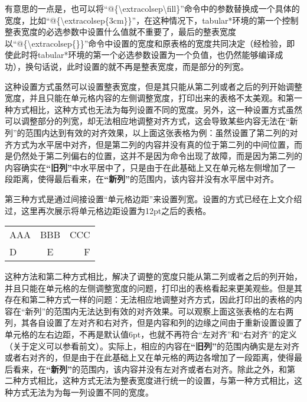 ﻿\documentclass{article}
\begin{document}
    有意思的一点是，也可以将``@\{\textbackslash extracolsep{\textbackslash fill}\}''命令中的参数替换成一个具体的宽度，比如``@\{\textbackslash extracolsep\{3cm\}\}''，在这种情况下，tabular*环境的第一个控制整表宽度的必选参数中设置什么值就不重要了，最后的整表宽度以``@\{\textbackslash extracolsep\{\}\}''命令中设置的宽度和原表格的宽度共同决定（经检验，即使此时将tabular*环境的第一个必选参数设置为一个负值，也仍然能够编译成功），换句话说，此时设置的就不再是整表宽度，而是部分的列宽。
    
    这种设置方式虽然可以设置整表宽度，但是其只能从第二列或者之后的列开始调整宽度，并且只能在单元格内容的左侧调整宽度，打印出来的表格不太美观。和第一种方式相比，这种方式也无法为每列设置不同的宽度。另外，这一种设置方式虽然可以调整部分的列宽，却无法相应地调整对齐方式，这会导致某些内容无法在``新列''的范围内达到有效的对齐效果，以上面这张表格为例：虽然设置了第二列的对齐方式为水平居中对齐，但是第二列的内容并没有真的位于第二列的中间位置，而是仍然处于第二列偏右的位置，这并不是因为命令出现了故障，而是因为第二列的内容确实在\textbf{``旧列''}中水平居中了，只是由于在此基础上又在单元格左侧增加了一段距离，使得最后看来，在\textbf{``新列''}的范围内，该内容并没有水平居中对齐。

    第三种方式是通过间接设置``单元格边距''来设置列宽。设置的方式已经在上文介绍过，这里再次展示将单元格边距设置为12pt之后的表格。

    \mbox{}

    {\renewcommand{\tabcolsep}{12pt}

    \begin{tabular}{l|c|r}
        \hline
        AAA&BBB&CCC\\
        D&E&F\\
        \hline
    \end{tabular}
    }

    \mbox{}
    
    这种方法和第二种方式相比，解决了调整的宽度只能从第二列或者之后的列开始，并且只能在单元格的左侧调整宽度的问题，打印出的表格看起来更美观些。但是其存在和第二种方式一样的问题：无法相应地调整对齐方式，因此打印出的表格的内容在``新列''的范围内无法达到有效的对齐效果。可以观察上面这张表格的左右两列，其各自设置了左对齐和右对齐，但是内容和列的边缘之间由于重新设置设置了单元格的左右边距，不再是默认值6pt，也就不再符合``左对齐''和``右对齐''的定义（关于定义可以参看前文）。实际上，相应的内容在\textbf{``旧列''}的范围内确实是左对齐或者右对齐的，但是由于在此基础上又在单元格的两边各增加了一段距离，使得最后看来，在\textbf{``新列''}的范围内，该内容并没有左对齐或者右对齐。除此之外，和第二种方式相比，这种方式无法为整表宽度进行统一的设置，与第一种方式相比，这种方式无法为为每一列设置不同的宽度。
\end{document}
